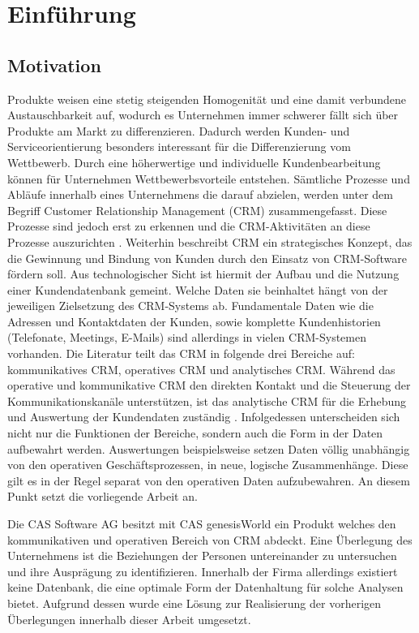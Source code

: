 \chapter{Einführung}
\label{ch:Einfuehrung}

\section{Motivation}
\label{ch:Einfuehrung:sec:Motivation}

Produkte weisen eine stetig steigenden Homogenität und eine damit verbundene Austauschbarkeit auf, wodurch es Unternehmen immer schwerer fällt sich über Produkte am Markt zu differenzieren. Dadurch werden Kunden- und Serviceorientierung besonders interessant für die Differenzierung vom Wettbewerb. Durch eine höherwertige und individuelle Kundenbearbeitung können für Unternehmen Wettbewerbsvorteile entstehen. Sämtliche Prozesse und Abläufe innerhalb eines Unternehmens die darauf abzielen, werden unter dem Begriff Customer Relationship Management (CRM) zusammengefasst. Diese Prozesse sind jedoch erst zu erkennen und die CRM-Aktivitäten an diese Prozesse auszurichten \cite{SWB-1001}. Weiterhin beschreibt CRM ein strategisches Konzept, das die Gewinnung und Bindung von Kunden durch den Einsatz von CRM-Software fördern soll. Aus technologischer Sicht ist hiermit der Aufbau und die Nutzung einer Kundendatenbank gemeint. Welche Daten sie beinhaltet hängt von der jeweiligen Zielsetzung des CRM-Systems ab. Fundamentale Daten wie die Adressen und Kontaktdaten der Kunden, sowie komplette Kundenhistorien (Telefonate, Meetings, E-Mails) sind allerdings in vielen CRM-Systemen vorhanden. Die Literatur teilt das CRM in folgende drei Bereiche auf: kommunikatives CRM, operatives CRM und analytisches CRM. Während das operative und kommunikative CRM den direkten Kontakt und die Steuerung der Kommunikationskanäle unterstützen, ist das analytische CRM für die Erhebung und Auswertung der Kundendaten zuständig \cite{SWB-375372644}. Infolgedessen unterscheiden sich nicht nur die Funktionen der Bereiche, sondern auch die Form in der Daten aufbewahrt werden. Auswertungen beispielsweise setzen Daten völlig unabhängig von den operativen Geschäftsprozessen, in neue, logische Zusammenhänge. Diese gilt es in der Regel separat von den operativen Daten aufzubewahren. An diesem Punkt setzt die vorliegende Arbeit an. 

Die CAS Software AG besitzt mit CAS genesisWorld ein Produkt welches den kommunikativen und operativen Bereich von CRM abdeckt. Eine Überlegung des Unternehmens ist die Beziehungen der Personen untereinander zu untersuchen und ihre Ausprägung zu identifizieren. Innerhalb der Firma allerdings existiert keine Datenbank, die eine optimale Form der Datenhaltung für solche Analysen bietet. Aufgrund dessen wurde eine Lösung zur Realisierung der vorherigen Überlegungen innerhalb dieser Arbeit umgesetzt.


